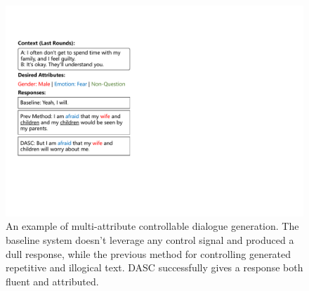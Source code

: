 \begin{figure}[th]
    \centering
    \includegraphics[width=1.0\columnwidth]{figures/teaser_example.pdf}
    \caption{An example of multi-attribute controllable dialogue generation. The baseline system doesn't leverage any control signal and produced a dull response, while the previous method for controlling generated repetitive and illogical text. DASC successfully gives a response both fluent and attributed.}
    \label{fig:teaser_example}
\end{figure}

